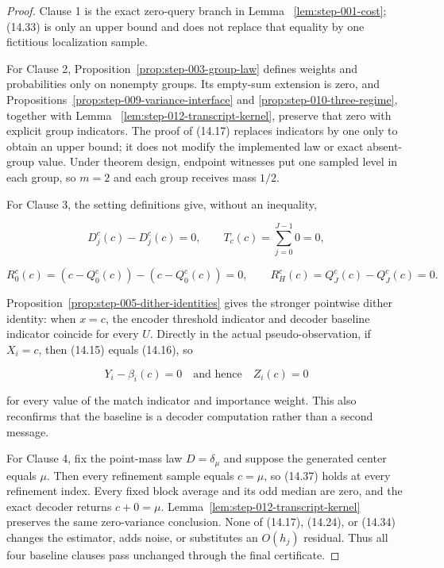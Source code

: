 \begin{proof}
Clause 1 is the exact zero-query branch in Lemma~
\ref{lem:step-001-cost}; (14.33) is only an upper bound and does not replace
that equality
by one fictitious localization sample.

For Clause 2, Proposition~\ref{prop:step-003-group-law} defines weights and
probabilities only on nonempty groups. Its empty-sum extension is zero, and
Propositions~\ref{prop:step-009-variance-interface} and
\ref{prop:step-010-three-regime}, together with Lemma~
\ref{lem:step-012-transcript-kernel}, preserve that zero with explicit group
indicators.
The proof of (14.17) replaces indicators by one only to obtain an upper
bound; it does not modify the implemented law or exact absent-group value.
Under theorem design, endpoint witnesses put one sampled level in
each group, so \(m=2\) and each group receives mass \(1/2\).

For Clause 3, the setting definitions give, without an inequality,

\[
D_j^c(c)-D_j^c(c)=0,
\qquad
T_c(c)=\sum_{j=0}^{J-1}0=0,
\tag{14.35}
\]

\[
R_0^c(c)
=(c-Q_0^c(c))-(c-Q_0^c(c))=0,
\qquad
R_H^c(c)=Q_J^c(c)-Q_J^c(c)=0.
\tag{14.36}
\]

Proposition~\ref{prop:step-005-dither-identities} gives the stronger
pointwise dither identity: when
\(x=c\), the encoder threshold indicator and decoder baseline indicator
coincide for every \(U\). Directly in the actual pseudo-observation, if
\(X_i=c\), then (14.15) equals (14.16), so

\[
Y_i-\beta_i(c)=0
\quad\text{and hence}\quad
Z_i(c)=0
\tag{14.37}
\]

for every value of the match indicator and importance weight. This also
reconfirms that the baseline is a decoder computation rather than a second
message.

For Clause 4, fix the point-mass law \(D=\delta_\mu\) and suppose the
generated center equals \(\mu\). Then every refinement sample equals
\(c=\mu\), so (14.37) holds at every refinement index. Every fixed block
average and its odd median are zero, and the exact decoder returns
\(c+0=\mu\). Lemma~\ref{lem:step-012-transcript-kernel} preserves the same
zero-variance conclusion.
None of (14.17), (14.24), or (14.34) changes the estimator, adds noise, or
substitutes an \(O(h_j)\) residual. Thus all four baseline clauses pass
unchanged through the final certificate.
\end{proof}

